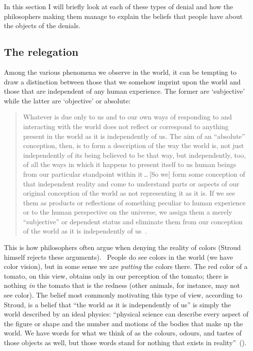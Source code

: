 \documentclass[11pt]{article}
\newenvironment{squote}{\begin{quote}\begin{singlespace}}{\end{singlespace}\end{quote}}
\begin{document}
\begin{spacing}{1.5}
In this section I will briefly look at each of these types of denial and how the philosophers making them manage to explain the beliefs that people have about the objects of the denials.

\subsection{The relegation}
\label{relegate}
Among the various phenomena we observe in the world, it can be tempting to draw a distinction between those that we somehow imprint upon the world and those that are independent of any human experience. The former are `subjective' while the latter are `objective' or absolute:
\begin{squote}
Whatever is due only to us and to our own ways of responding to and interacting with the world does not reflect or correspond to anything present in the world as it is independently of us. The aim of an ``absolute'' conception, then, is to form a description of the way the world is, not just independently of its being believed to be that way, but independently, too, of all the ways in which it happens to present itself to us human beings from our particular standpoint within it\,\ldots\,[So we] form some conception of that independent reality and come to understand parts or aspects of our original conception of the world as not representing it as it is. If we see them as products or reflections of something peculiar to human experience or to the human perspective on the universe, we assign them a merely ``subjective'' or dependent status and eliminate them from our conception of the world as it is independently of us~\citep[30--31]{stroud2000a}.
\end{squote}

This is how philosophers often argue when denying the reality of colors (Stroud himself rejects these arguments).%
%
%
\ People do see colors in the world (we have color vision), but in some sense we are {\em putting} the colors there. The red color of a tomato, on this view, obtains only in our perception of the tomato; there is nothing {\em in} the tomato that is the redness (other animals, for instance, may not see color). The belief most commonly motivating this type of view, according to Stroud, is a belief that ``the world as it is independently of us'' is simply the world described by an ideal physics: ``physical science can describe every aspect of the figure or shape and the number and motions of the bodies that make up the world. We have words for what we think of as the colours, odours, and tastes of those objects as well, but those words stand for nothing that exists in reality''~(\citeyear[8]{stroud2000a}).


\end{spacing}
\end{document}

